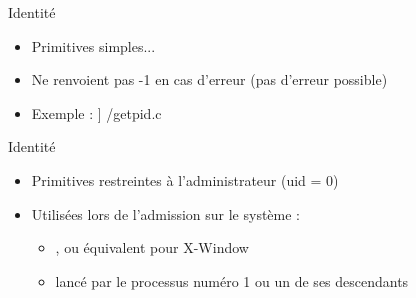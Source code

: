 

\begin {frame} {Identité}

    \begin {itemize}
	\item Primitives simples...
	\item Ne renvoient pas -1 en cas d'erreur (pas d'erreur possible)
	\item Exemple :
	    \fD\lstmonstyle] {\inc/getpid.c}
    \end {itemize}
\end {frame}

\begin {frame} {Identité}

    \begin {itemize}
	\item Primitives restreintes à l'administrateur (uid = 0)

	\item Utilisées lors de l'admission sur le système :
	    \begin {itemize}
		\item {},  ou équivalent pour
		    X-Window
		\item lancé par le processus numéro 1 ou un de ses
		    descendants
	    \end {itemize}
    \end {itemize}
\end {frame}

